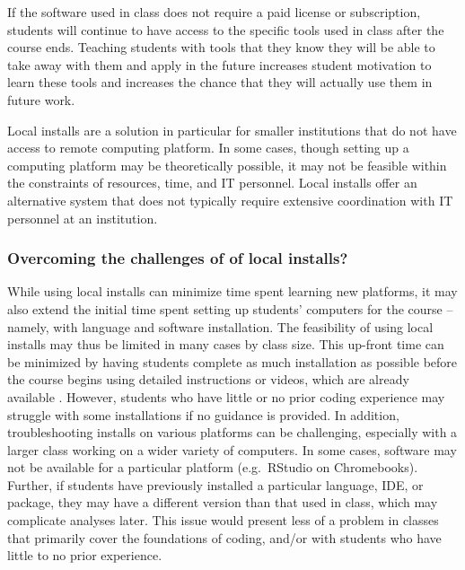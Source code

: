 If the software used in class does not require a paid license or subscription, students will continue to have access to the specific tools used in class after the course ends. Teaching students with tools that they know they will be able to take away with them and apply in the future increases student motivation to learn these tools and increases the chance that they will actually use them in future work.

Local installs are a solution in particular for smaller institutions that do not have access to remote computing platform. In some cases, though setting up a computing platform may be theoretically possible, it may not be feasible within the constraints of resources, time, and IT personnel. Local installs offer an alternative system that does not typically require extensive coordination with IT personnel at an institution.

\subsubsection{Overcoming the challenges of of local installs?} 

While using local installs can minimize time spent learning new platforms, it may also extend the initial time spent setting up students' computers for the course -- namely, with language and software installation. The feasibility of using local installs may thus be limited in many cases by class size. This up-front time can be minimized by having students complete as much installation as possible before the course begins
using detailed instructions or videos, which are already available .
However, students who have little or no prior coding experience may struggle with some installations if no guidance is provided. In addition, troubleshooting installs on various platforms can be challenging, especially with a larger class working on a wider variety of computers. 
In some cases, software may not be available for a particular platform (e.g.\ RStudio on Chromebooks).
Further, if students have previously installed a particular language, IDE, or package, they may have a different version than that used in class, which may complicate analyses later. This issue would present less of a problem in classes that primarily cover the foundations of coding, and/or with students who have little to no prior experience.


